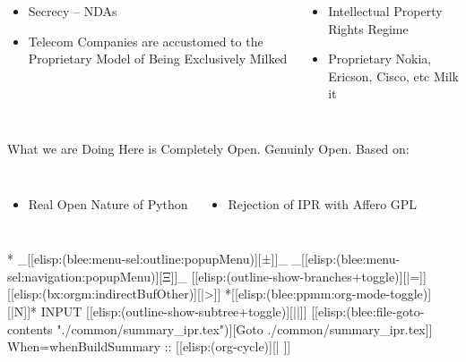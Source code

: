 \begin{whenOrg}
\begin{verblatex}
\begin{frame}[fragile,plain,label=breakingWalledGarden]
\begin{small}
\begin{columns}[T]
\begin{itemize}
  \item Secrecy -- NDAs
  \item Telecom Companies are accustomed to the Proprietary Model of Being Exclusively Milked
\end{itemize}


\begin{itemize}
  \item Intellectual Property Rights Regime
  \item Proprietary  Nokia, Ericson, Cisco, etc Milk it
\end{itemize}

\end{columns}
\end{small}

\bigskip


\begin{exampleblock}{What we are Doing Here is Completely Open.}
  Genuinly Open. Based on:
    \end{exampleblock}

\bigskip

\begin{columns}[T]

\begin{itemize}
  \item Real Open Nature of Python
\end{itemize}


\begin{itemize}
  \item Rejection of IPR with Affero GPL
\end{itemize}

\end{columns}



\end{frame}
\end{verblatex}


\begin{whenOrg}
*  _[[elisp:(blee:menu-sel:outline:popupMenu)][±]]_ _[[elisp:(blee:menu-sel:navigation:popupMenu)][Ξ]]_ [[elisp:(outline-show-branches+toggle)][|=]] [[elisp:(bx:orgm:indirectBufOther)][|>]] *[[elisp:(blee:ppmm:org-mode-toggle)][|N]]*  INPUT      [[elisp:(outline-show-subtree+toggle)][||]]   [[elisp:(blee:file-goto-contents "./common/summary_ipr.tex")][Goto ./common/summary_ipr.tex]] When=whenBuildSummary ::  [[elisp:(org-cycle)][| ]]
\end{whenOrg}
\begin{whenBuildSummary}

\end{whenBuildSummary}


\end{whenOrg}
